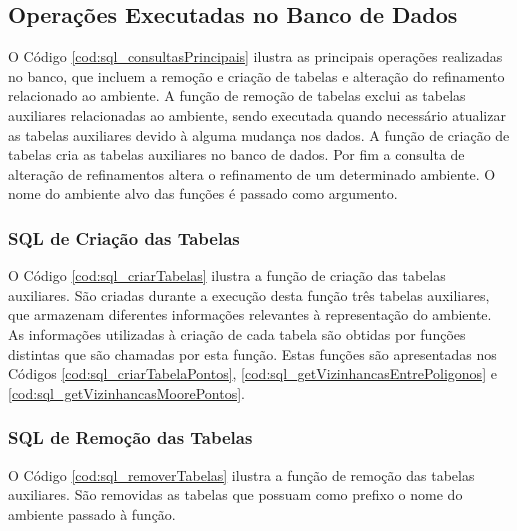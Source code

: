 \newpage

\subsection{Operações Executadas no Banco de Dados}

O Código \ref{cod:sql_consultasPrincipais} ilustra as principais operações realizadas no banco, que incluem a remoção e criação de tabelas e alteração do refinamento relacionado ao ambiente. A função de remoção de tabelas exclui as tabelas auxiliares relacionadas ao ambiente, sendo executada quando necessário atualizar as tabelas auxiliares devido à alguma mudança nos dados. A função de criação de tabelas cria as tabelas auxiliares no banco de dados. Por fim a consulta de alteração de refinamentos altera o refinamento de um determinado ambiente. O nome do ambiente alvo das funções é passado como argumento.



\subsubsection{SQL de Criação das Tabelas}

O Código \ref{cod:sql_criarTabelas} ilustra a função de criação das tabelas auxiliares. São criadas durante a execução desta função três tabelas auxiliares, que armazenam diferentes informações relevantes à representação do ambiente. As informações utilizadas à criação de cada tabela são obtidas por funções distintas que são chamadas por esta função. Estas funções são apresentadas nos Códigos \ref{cod:sql_criarTabelaPontos}, \ref{cod:sql_getVizinhancasEntrePoligonos} e \ref{cod:sql_getVizinhancasMoorePontos}.



\subsubsection{SQL de Remoção das Tabelas}

O Código \ref{cod:sql_removerTabelas} ilustra a função de remoção das tabelas auxiliares. São removidas as tabelas que possuam como prefixo o nome do ambiente passado à função. 

